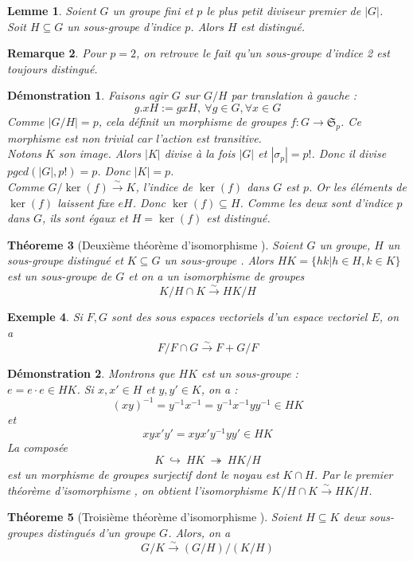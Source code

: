 \documentclass[a4paper, oneside]{report}
\theoremstyle{break}
\newtheorem{thm}{Théoreme}[section] %
\newtheorem{lemme}[thm]{Lemme}
\newtheorem{exem}[thm]{Exemple}
\newtheorem{remar}[thm]{Remarque}
\newtheorem*{demo}{Démonstration}
\newcommand{\sevs}{sous espaces vectoriels }
\newcommand{\ev}{espace vectoriel }
\newcommand{\mdg}{morphisme de groupes }
\newcommand{\isom}{isomorphisme }
\newcommand{\sg}{sous-groupe }
\newcommand{\sgs}{sous-groupes }
\newcommand{\fong}{\overset{\sim}{\rightarrow}}
\newcommand{\inj}{\hookrightarrow}
\newcommand{\surj}{\twoheadrightarrow}
\renewcommand{\S}{\mathfrak{S}}
\begin{document}
\begin{lemme}
Soient $G$ un groupe fini et $p$ le plus petit diviseur premier de $|G|$.\\
Soit $H\subseteq G$ un \sg d'indice $p$. Alors $H$ est distingué.
\end{lemme}

\begin{remar}
Pour $p=2$, on retrouve le fait qu'un \sg d'indice 2 est toujours distingué.
\end{remar}

\begin{demo}
Faisons agir $G$ sur $G/H$ par translation à gauche :
$$g.xH := gxH,~\forall g\in G,\forall x\in G$$
Comme $|G/H|=p$, cela définit un \mdg $f:G\rightarrow \S_p$. Ce morphisme est non trivial car l'action est transitive.\\
Notons $K$ son image. Alors $|K|$ divise à la fois $|G|$ et $|\sigma_p|=p!$. Donc il divise $pgcd(|G|,p!)=p$. Donc $|K|=p$.\\
Comme $G/\ker(f)\fong K$, l'indice de $\ker (f)$ dans $G$ est $p$. Or les éléments de $\ker(f)$ laissent fixe $eH$. Donc $\ker (f)\subseteq H$. Comme les deux sont d'indice $p$ dans $G$, ils sont égaux et $H=\ker (f)$ est distingué.
\end{demo}

\begin{thm}[Deuxième théorème d'\isom]
Soient $G$ un groupe, $H$ un \sg distingué et $K\subseteq G$ un \sg. Alors $HK=\{hk| h\in H, k\in K\}$ est un \sg de $G$ et on a un \isom de groupes 
$$K/H\cap K \fong HK/H$$
\end{thm}

\begin{exem}
Si $F,G$ sont des \sevs d'un \ev $E$, on a 
$$F/F\cap G \fong F+G/F$$
\end{exem}

\begin{demo}
Montrons que $HK$ est un \sg :\\
$e=e \cdot e \in HK$. Si $x,x'\in H$ et $y,y' \in K$, on a :
$$(xy)^{-1}=y^{-1}x^{-1}=y^{-1}x^{-1}yy^{-1}\in HK$$
et 
$$xyx'y'=xyx'y^{-1}yy'\in HK$$
La composée 
$$K~\inj~HK~\surj~HK/H$$
est un \mdg surjectif dont le noyau est $K\cap H$. Par le premier théorème d'\isom, on obtient l'\isom $K/H\cap K \fong HK/H$.
\end{demo}

\begin{thm}[Troisième théorème d'\isom]
Soient $H\subseteq K$ deux \sgs distingués d'un groupe $G$. Alors, on a 
$$G/K \fong (G/H) \big/ (K/H)$$
\end{thm}
\end{document}
